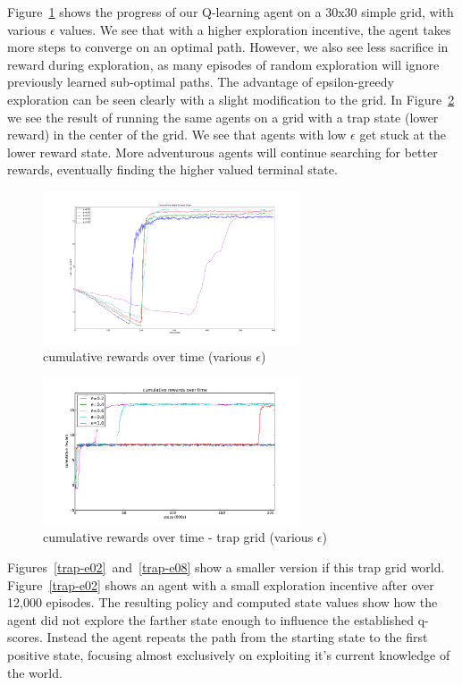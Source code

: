 \documentclass{sig-alternate}
\begin{document}
Figure~\ref{simple-q-epsilon} shows the progress of our Q-learning agent on a 30x30 simple grid, with various $\epsilon$ values. We see that with a higher exploration incentive, the agent takes more steps to converge on an optimal path. However, we also see less sacrifice in reward during exploration, as many episodes of random exploration will ignore previously learned sub-optimal paths. The advantage of epsilon-greedy exploration can be seen clearly with a slight modification to the grid. In Figure~\ref{trap-q-epsilon} we see the result of running the same agents on a grid with a trap state (lower reward) in the center of the grid. We see that agents with low $\epsilon$ get stuck at the lower reward state. More adventurous agents will continue searching for better rewards, eventually finding the higher valued terminal state.



\begin{figure}[!htbp]
    \centering
    \includegraphics[width=3in]{images/simple/q-epsilon.pdf}
    \caption{cumulative rewards over time (various $\epsilon$) \label{simple-q-epsilon}}
\end{figure} 

\begin{figure}[!htbp]
    \centering
    \includegraphics[width=3in]{images/trap/q-epsilon.pdf}
    \caption{cumulative rewards over time - trap grid (various $\epsilon$) \label{trap-q-epsilon}}
\end{figure} 

Figures~\ref{trap-e02}~and~\ref{trap-e08} show a smaller version if this trap grid world. Figure~\ref{trap-e02} shows an agent with a small exploration incentive after over 12,000 episodes. The resulting policy and computed state values show how the agent did not explore the farther state enough to influence the established q-scores. Instead the agent repeats the path from the starting state to the first positive state, focusing almost exclusively on exploiting it's current knowledge of the world.
\end{document}
